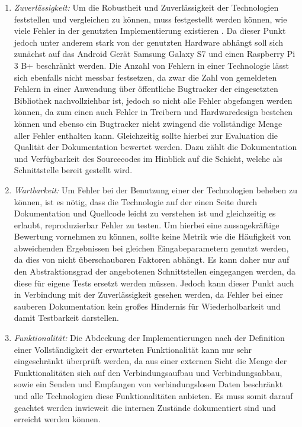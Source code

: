     	\begin{enumerate}
    	\item {\it Zuverlässigkeit:} 
    	Um die Robustheit und Zuverlässigkeit der Technologien feststellen und vergleichen zu können, muss festgestellt werden können, wie viele Fehler in der genutzten Implementierung existieren \cite[S.9]{liggesmeyer}. Da dieser Punkt jedoch unter anderem stark von der genutzten Hardware abhängt soll sich zunächst auf das Android Gerät Samsung Galaxy S7 und einen Raspberry Pi 3 B+ beschränkt werden. Die Anzahl von Fehlern in einer Technologie lässt sich ebenfalls nicht messbar festsetzen, da zwar die Zahl von gemeldeten Fehlern in einer Anwendung über öffentliche Bugtracker der eingesetzten Bibliothek nachvollziehbar ist, jedoch so nicht alle Fehler abgefangen werden können, da zum einen auch Fehler in Treibern und Hardwaredesign bestehen können und ebenso ein Bugtracker nicht zwingend die vollständige Menge aller Fehler enthalten kann. Gleichzeitig sollte hierbei zur Evaluation die Qualität der Dokumentation bewertet werden. Dazu zählt die Dokumentation und Verfügbarkeit des Sourcecodes im Hinblick auf die Schicht, welche als Schnittstelle bereit gestellt wird.
    	\item {\it Wartbarkeit:} Um Fehler bei der Benutzung einer der Technologien beheben zu können, ist es nötig, dass die Technologie auf der einen Seite durch Dokumentation und Quellcode leicht zu verstehen ist und gleichzeitig es erlaubt, reproduzierbar Fehler zu testen. Um hierbei eine aussagekräftige Bewertung vornehmen zu können, sollte keine Metrik wie die Häufigkeit von abweichenden Ergebnissen bei gleichen Eingabeparametern genutzt werden, da dies von nicht überschaubaren Faktoren abhängt. Es kann daher nur auf den Abstraktionsgrad der angebotenen Schnittstellen eingegangen werden, da diese für eigene Tests ersetzt werden müssen. Jedoch kann dieser Punkt auch in Verbindung mit der Zuverlässigkeit gesehen werden, da Fehler bei einer sauberen Dokumentation kein großes Hindernis für Wiederholbarkeit und damit Testbarkeit darstellen.
    	\item {\it Funktionalität:}
    	Die Abdeckung der Implementierungen nach der Definition einer Vollständigkeit der erwarteten Funktionalität \cite[S.8]{liggesmeyer} kann nur sehr eingeschränkt überprüft werden, da aus einer externen Sicht die Menge der Funktionalitäten sich auf den Verbindungsaufbau und Verbindungsabbau, sowie ein Senden und Empfangen von verbindungslosen Daten beschränkt und alle Technologien diese Funktionalitäten anbieten. Es muss somit darauf geachtet werden inwieweit die internen Zustände dokumentiert sind und erreicht werden können.

\end{enumerate}

